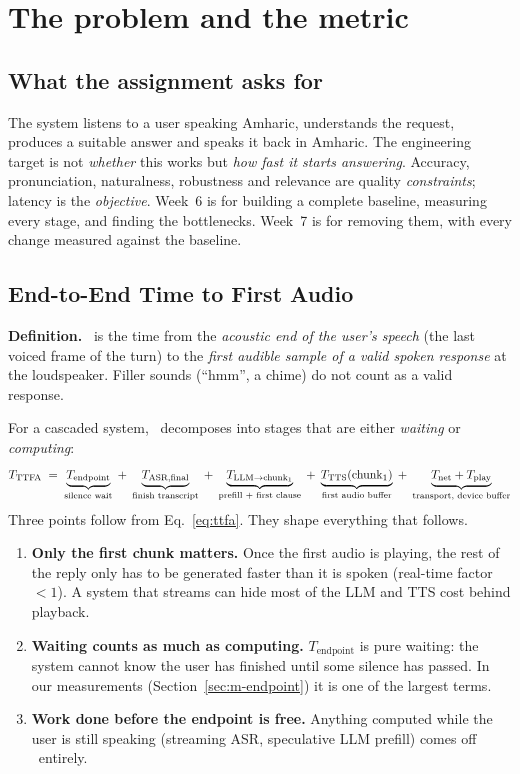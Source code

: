 \section{The problem and the metric}
\label{sec:problem}

\subsection{What the assignment asks for}
The system listens to a user speaking Amharic, understands the request, produces a suitable
answer and speaks it back in Amharic. The engineering target is not \emph{whether} this works but
\emph{how fast it starts answering}. Accuracy, pronunciation, naturalness, robustness and
relevance are quality \emph{constraints}; latency is the \emph{objective}. Week~6 is for building a
complete baseline, measuring every stage, and finding the bottlenecks. Week~7 is for
removing them, with every change measured against the baseline.

\subsection{End-to-End Time to First Audio}
\label{sec:ttfa}
\begin{keybox}
\textbf{Definition.} \ttfa\ is the time from the \emph{acoustic end of the user's speech} (the last
voiced frame of the turn) to the \emph{first audible sample of a valid spoken response} at the
loudspeaker. Filler sounds (``hmm'', a chime) do not count as a valid response.
\end{keybox}

For a cascaded system, \ttfa\ decomposes into stages that are either \emph{waiting} or \emph{computing}:
\begin{equation}
T_{\mathrm{TTFA}} \;=\; \underbrace{T_{\text{endpoint}}}_{\text{silence wait}}
\;+\; \underbrace{T_{\text{ASR,final}}}_{\text{finish transcript}}
\;+\; \underbrace{T_{\text{LLM}\rightarrow\text{chunk}_1}}_{\text{prefill + first clause}}
\;+\; \underbrace{T_{\text{TTS}}(\text{chunk}_1)}_{\text{first audio buffer}}
\;+\; \underbrace{T_{\text{net}} + T_{\text{play}}}_{\text{transport, device buffer}}
\label{eq:ttfa}
\end{equation}
Three points follow from Eq.~\eqref{eq:ttfa}. They shape everything that follows.
\begin{enumerate}
  \item \textbf{Only the first chunk matters.} Once the first audio is playing, the rest of the reply
  only has to be generated faster than it is spoken (real-time factor $<1$). A system that
  streams can hide most of the LLM and TTS cost behind playback.
  \item \textbf{Waiting counts as much as computing.} $T_{\text{endpoint}}$ is pure waiting: the system
  cannot know the user has finished until some silence has passed. In our measurements
  (Section~\ref{sec:m-endpoint}) it is one of the largest terms.
  \item \textbf{Work done before the endpoint is free.} Anything computed while the user is still
  speaking (streaming ASR, speculative LLM prefill) comes off \ttfa\ entirely.
\end{enumerate}

